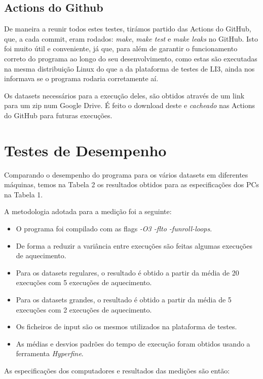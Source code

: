 \documentclass{article}
\begin{document}
        \subsection{Actions do Github}
            De maneira a reunir todos estes testes, tirámos partido das Actions do GitHub, que, a cada
            commit, eram rodados: \textit{make}, \textit{make test} e \textit{make leaks} no GitHub. Isto foi muito útil
            e conveniente, já que, para além de garantir o funcionamento correto do programa ao longo do seu desenvolvimento,
            como estas são executadas na mesma distribuição Linux do que a da plataforma de testes de LI3,
            ainda nos informava se o programa rodaria corretamente aí.
            
            Os datasets necessários para a execução deles, são obtidos através de um link para um zip num
            Google Drive. É feito o download deste e \textit{cacheado} nas Actions do GitHub para futuras
            execuções.
     
    \section{Testes de Desempenho}
            Comparando o desempenho do programa para os vários datasets em diferentes máquinas,
            temos na Tabela 2 os resultados obtidos para as especificações dos PCs na Tabela 1.
            
            A metodologia adotada para a medição foi a seguinte:

            \begin{itemize}
                \item O programa foi compilado com as flags \emph{-O3 -flto -funroll-loops}.
                \item De forma a reduzir a variância entre execuções são feitas algumas execuções de aquecimento.
                \item Para os datasets regulares, o resultado é obtido a partir da média de 20 execuções
                com 5 execuções de aquecimento.
                \item Para os datasets grandes, o resultado é obtido a partir da média de 5 execuções
                com 2 execuções de aquecimento.
                \item Os ficheiros de input são os mesmos utilizados na plataforma de testes.
                \item As médias e desvios padrões do tempo de execução foram obtidos usando a ferramenta \textit{Hyperfine}.
            \end{itemize}
            \pagebreak
           As especificações dos computadores e resultados das medições são então:
            
\end{document}
